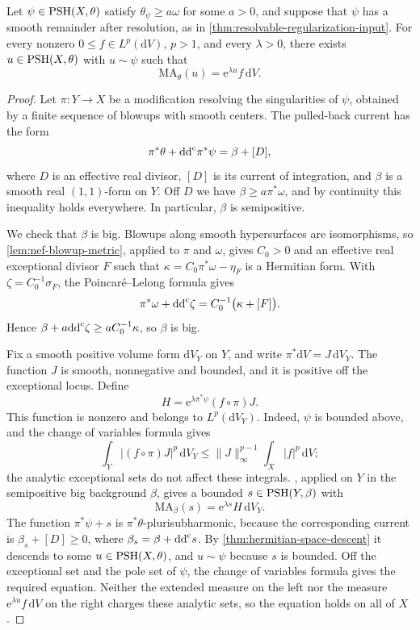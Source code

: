 \begin{lemma}\label{lem:big-resolved-equation}
Let $\psi\in\mathrm{PSH}(X,\theta)$ satisfy $\theta_\psi\geq a\omega$ for some $a>0$, and suppose that $\psi$ has a smooth remainder after resolution, as in \cref{thm:resolvable-regularization-input}. For every nonzero $0\leq f\in L^p(\mathrm{d}V)$, $p>1$, and every $\lambda>0$, there exists $u\in\mathrm{PSH}(X,\theta)$ with $u\sim\psi$ such that
\[
 \mathrm{MA}_\theta(u)=\mathrm{e}^{\lambda u}f\,\mathrm{d}V.
\]
\end{lemma}
\begin{proof}
Let $\pi\colon Y\to X$ be a modification resolving the singularities of $\psi$, obtained by a finite sequence of blowups with smooth centers. The pulled-back current has the form
\[
 \pi^*\theta+\mathrm{dd}^{\mathrm{c}}\pi^*\psi=\beta+[D],
\]
where $D$ is an effective real divisor, $[D]$ is its current of integration, and $\beta$ is a smooth real $(1,1)$-form on $Y$. Off $D$ we have $\beta\geq a\pi^*\omega$, and by continuity this inequality holds everywhere. In particular, $\beta$ is semipositive.

We check that $\beta$ is big. Blowups along smooth hypersurfaces are isomorphisms, so \cref{lem:nef-blowup-metric}, applied to $\pi$ and $\omega$, gives $C_0>0$ and an effective real exceptional divisor $F$ such that $\kappa=C_0\pi^*\omega-\eta_F$ is a Hermitian form. With $\zeta=C_0^{-1}\sigma_F$, the Poincar\'e--Lelong formula gives
\[
 \pi^*\omega+\mathrm{dd}^{\mathrm{c}}\zeta=C_0^{-1}\bigl(\kappa+[F]\bigr).
\]
Hence $\beta+a\mathrm{dd}^{\mathrm{c}}\zeta\geq aC_0^{-1}\kappa$, so $\beta$ is big.

Fix a smooth positive volume form $\mathrm{d}V_Y$ on $Y$, and write $\pi^*\mathrm{d}V=J\,\mathrm{d}V_Y$. The function $J$ is smooth, nonnegative and bounded, and it is positive off the exceptional locus. Define
\[
 H=\mathrm{e}^{\lambda\pi^*\psi}(f\circ\pi)J.
\]
This function is nonzero and belongs to $L^p(\mathrm{d}V_Y)$. Indeed, $\psi$ is bounded above, and the change of variables formula gives
\[
 \int_Y|(f\circ\pi)J|^p\,\mathrm{d}V_Y
 \leq\|J\|_\infty^{p-1}\int_X|f|^p\,\mathrm{d}V;
\]
the analytic exceptional sets do not affect these integrals. , applied on $Y$ in the semipositive big background $\beta$, gives a bounded $s\in\mathrm{PSH}(Y,\beta)$ with
\[
 \mathrm{MA}_\beta(s)=\mathrm{e}^{\lambda s}H\,\mathrm{d}V_Y.
\]
The function $\pi^*\psi+s$ is $\pi^*\theta$-plurisubharmonic, because the corresponding current is $\beta_s+[D]\geq0$, where $\beta_s=\beta+\mathrm{dd}^{\mathrm{c}} s$. By \cref{thm:hermitian-space-descent} it descends to some $u\in\mathrm{PSH}(X,\theta)$, and $u\sim\psi$ because $s$ is bounded. Off the exceptional set and the pole set of $\psi$, the change of variables formula gives the required equation. Neither the extended measure on the left nor the measure $\mathrm{e}^{\lambda u}f\,\mathrm{d}V$ on the right charges these analytic sets, so the equation holds on all of $X$.
\end{proof}

